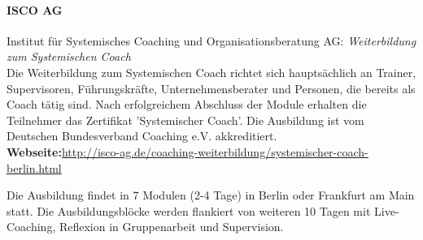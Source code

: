 \documentclass[11pt,a4paper]{article}
\begin{document}
\paragraph{\textsf{ISCO AG}} Institut für Systemisches Coaching und Organisationsberatung AG: \textsl{Weiterbildung zum Systemischen Coach}\\
Die Weiterbildung zum Systemischen Coach richtet sich hauptsächlich an Trainer, Supervisoren, Führungskräfte, Unternehmensberater und Personen, die bereits als Coach tätig sind. Nach erfolgreichem Abschluss der Module erhalten die Teilnehmer das Zertifikat 'Systemischer Coach'. Die Ausbildung ist vom Deutschen Bundesverband Coaching e.V. akkreditiert.\\

\textbf{Webseite:}\textsf{\textcolor{MidnightBlue}{\url{http://isco-ag.de/coaching-weiterbildung/systemischer-coach-berlin.html}}}

Die Ausbildung findet in 7 Modulen (2-4 Tage) in Berlin oder Frankfurt am Main statt. Die Ausbildungsblöcke werden flankiert von weiteren 10 Tagen mit Live-Coaching, Reflexion in Gruppenarbeit und Supervision.
\end{document}
